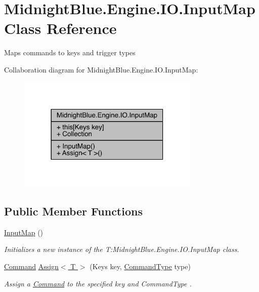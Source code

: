 \hypertarget{class_midnight_blue_1_1_engine_1_1_i_o_1_1_input_map}{}\section{Midnight\+Blue.\+Engine.\+I\+O.\+Input\+Map Class Reference}
\label{class_midnight_blue_1_1_engine_1_1_i_o_1_1_input_map}


Maps commands to keys and trigger types  




Collaboration diagram for Midnight\+Blue.\+Engine.\+I\+O.\+Input\+Map\+:
\nopagebreak
\begin{figure}[H]
\begin{center}
\leavevmode
\includegraphics[width=246pt]{class_midnight_blue_1_1_engine_1_1_i_o_1_1_input_map__coll__graph}
\end{center}
\end{figure}
\subsection*{Public Member Functions}
\begin{DoxyCompactItemize}
\item 
\hyperlink{class_midnight_blue_1_1_engine_1_1_i_o_1_1_input_map_aefd9eca9502059a5f316b31816b96604}{Input\+Map} ()
\begin{DoxyCompactList}\small\item\em Initializes a new instance of the T\+:\+Midnight\+Blue.\+Engine.\+I\+O.\+Input\+Map class. \end{DoxyCompactList}\item 
\hyperlink{class_midnight_blue_1_1_engine_1_1_i_o_1_1_command}{Command} \hyperlink{class_midnight_blue_1_1_engine_1_1_i_o_1_1_input_map_a51b8f423312c099cdcffc16bb751c9b6}{Assign$<$ T $>$} (Keys key, \hyperlink{namespace_midnight_blue_1_1_engine_1_1_i_o_a8bc3f159399ecadd590f7df1b54354b0}{Command\+Type} type)
\begin{DoxyCompactList}\small\item\em Assign a \hyperlink{class_midnight_blue_1_1_engine_1_1_i_o_1_1_command}{Command} to the specified key and Command\+Type . \end{DoxyCompactList}\end{DoxyCompactItemize}
